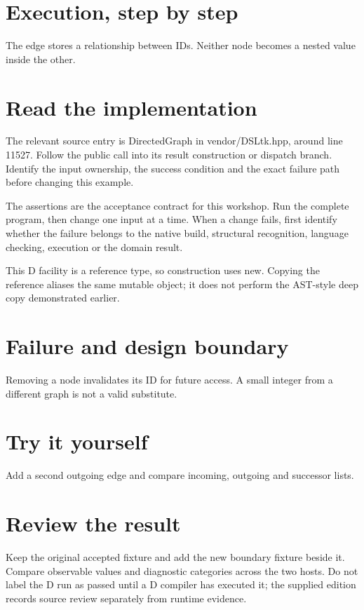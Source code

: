 
\section*{Execution, step by step}
The edge stores a relationship between IDs. Neither node becomes a nested value inside the other.

\section*{Read the implementation}
The relevant source entry is DirectedGraph in vendor/DSLtk.hpp, around line 11527. Follow the public call into its result construction or dispatch branch. Identify the input ownership, the success condition and the exact failure path before changing this example.

The assertions are the acceptance contract for this workshop. Run the complete program, then change one input at a time. When a change fails, first identify whether the failure belongs to the native build, structural recognition, language checking, execution or the domain result.

\clearpage
{}
This D facility is a reference type, so construction uses new. Copying the reference aliases the same mutable object; it does not perform the AST-style deep copy demonstrated earlier.


\section*{Failure and design boundary}
Removing a node invalidates its ID for future access. A small integer from a different graph is not a valid substitute.

\section*{Try it yourself}
Add a second outgoing edge and compare incoming, outgoing and successor lists.

\section*{Review the result}
Keep the original accepted fixture and add the new boundary fixture beside it. Compare observable values and diagnostic categories across the two hosts. Do not label the D run as passed until a D compiler has executed it; the supplied edition records source review separately from runtime evidence.


